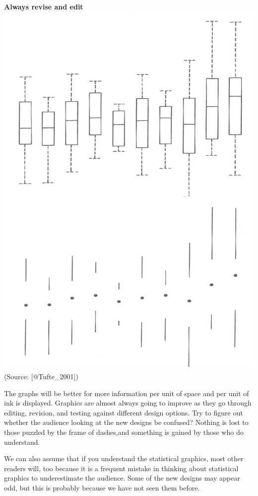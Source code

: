 \documentclass[]{book}
\theoremstyle{definition}
\theoremstyle{definition}
\theoremstyle{definition}
\theoremstyle{remark}
\begin{document}
\textbf{Always revise and edit}
\includegraphics{images/Tufte_figure4.png} (Source: {[}@Tufte\_2001{]})

The graphs will be better for more information per unit of space and per
unit of ink is displayed. Graphics are almost always going to improve as
they go through editing, revision, and testing against different design
options. Try to figure out whether the audience looking at the new
designs be confused? Nothing is lost to those puzzled by the frame of
dashes,and something is gained by those who do understand.

We can also assume that if you understand the statistical graphics, most
other readers will, too because it is a frequent mistake in thinking
about statistical graphics to underestimate the audience. Some of the
new designs may appear odd, but this is probably because we have not
seen them before.
\end{document}
